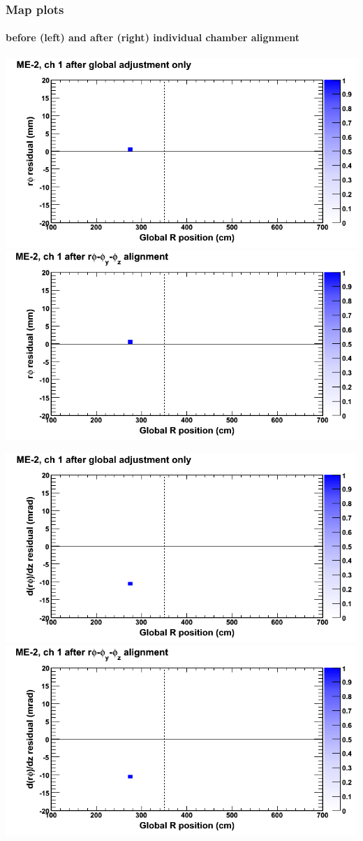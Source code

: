 \documentclass[compress]{beamer}
\begin{document}
\begin{frame}
\frametitle{Map plots}
\framesubtitle{before (left) and after (right) individual chamber alignment}
\includegraphics[width=0.5\linewidth]{ringmapplots_3dof/before_CSCvsr_mem2ch01_x.png} \includegraphics[width=0.5\linewidth]{ringmapplots_3dof/after_CSCvsr_mem2ch01_x.png}

\includegraphics[width=0.5\linewidth]{ringmapplots_3dof/before_CSCvsr_mem2ch01_dxdz.png} \includegraphics[width=0.5\linewidth]{ringmapplots_3dof/after_CSCvsr_mem2ch01_dxdz.png}
\end{frame}
\end{document}
